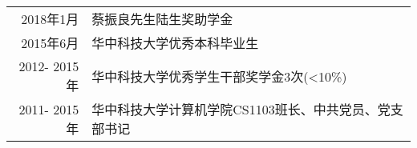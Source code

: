 %
%




\begin{tabular}{rl}	
	2018年1月 & 蔡振良先生陆生奖助学金 \\
	2015年6月 & 华中科技大学优秀本科毕业生 \\
	2012- 2015年 & 华中科技大学优秀学生干部奖学金3次(<10\%) \\
	2011- 2015年 & 华中科技大学计算机学院CS1103班长、中共党员、党支部书记　\\
\end{tabular}

